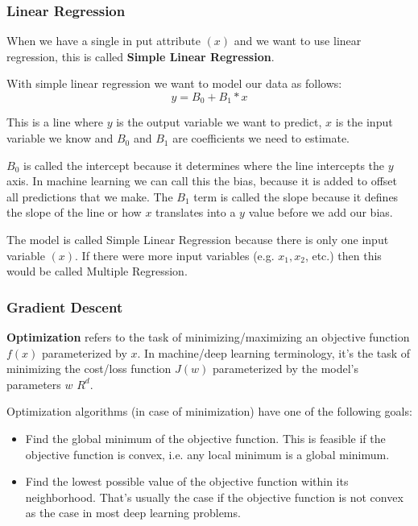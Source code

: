 \documentclass[conference,compsoc]{IEEEtran}
\begin{document}
\subsubsection{Linear Regression}

When we have a single in put attribute $(x)$ and we want to use linear regression, this is called \textbf{Simple Linear Regression}.

With simple linear regression we want to model our data as follows:
\[
    y = B_{0} + B_{1} * x
\]

This is a line where $y$ is the output variable we want to predict, $x$ is the input variable we know and $B_{0}$ and $B_{1}$ are coefficients we need to estimate.

$B_{0}$ is called the intercept because it determines where the line intercepts the $y$ axis. In machine learning we can call this the bias, because it is added to offset all predictions that we make. The $B_{1}$ term is called the slope because it defines the slope of the line or how $x$ translates into a $y$ value before we add our bias.

The model is called Simple Linear Regression because there is only one input variable $(x)$. If there were more input variables (e.g. $x_{1}, x_{2}$, etc.) then this would be called Multiple Regression.

\subsubsection{Gradient Descent}

\textbf{Optimization} refers to the task of minimizing/maximizing an objective function $f(x)$ parameterized by $x$. In machine/deep learning terminology, it’s the task of minimizing the cost/loss function $J(w)$ parameterized by the model’s parameters $w$ \epsilon $R^d$.

Optimization algorithms (in case of minimization) have one of the following goals:
\begin{itemize}
    \item Find the global minimum of the objective function. This is feasible if the objective function is convex, i.e. any local minimum is a global minimum.
    \item Find the lowest possible value of the objective function within its neighborhood. That’s usually the case if the objective function is not convex as the case in most deep learning problems.
\end{itemize}
\end{document}
